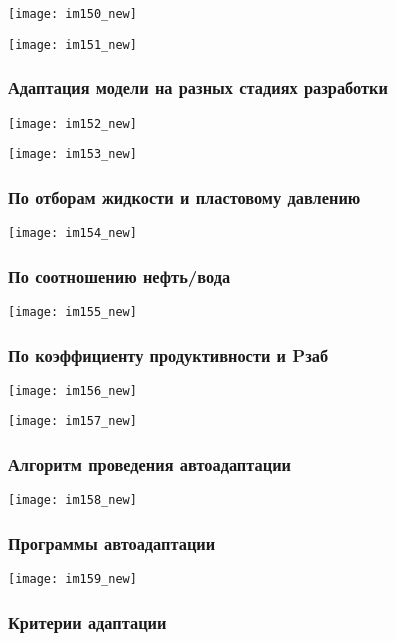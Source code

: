 \documentclass[main.tex]{subfiles}
\begin{document}
\texttt{[image: im150\_new]}

\texttt{[image: im151\_new]}

\subsubsection{Адаптация модели на разных стадиях разработки}

\texttt{[image: im152\_new]}

\texttt{[image: im153\_new]}

\subsubsection{По отборам жидкости и пластовому давлению}

\texttt{[image: im154\_new]}

\subsubsection{По соотношению нефть/вода}

\texttt{[image: im155\_new]}

\subsubsection{По коэффициенту продуктивности и Pзаб}

\texttt{[image: im156\_new]}

\texttt{[image: im157\_new]}

\subsubsection{Алгоритм проведения автоадаптации}

\texttt{[image: im158\_new]}

\subsubsection{Программы автоадаптации}

\texttt{[image: im159\_new]}

\subsubsection{Критерии адаптации}
\end{document}
